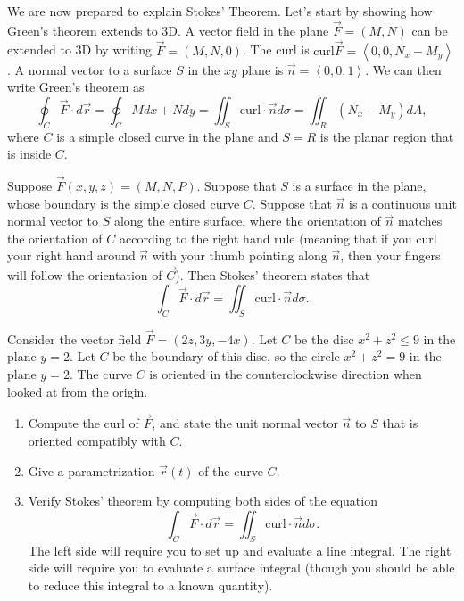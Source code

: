We are now prepared to explain Stokes' Theorem.  Let's start by showing how Green's theorem extends to 3D.
A vector field in the plane $\vec F = \left(M,N\right)$ can be extended to 3D by writing $\vec F = \left(M,N,0\right)$.  The curl is $\text{curl}\vec F = \left<0,0,N_x-M_y\right>$.  A normal vector to a surface $S$ in the $xy$ plane is $\vec n = \left<0,0,1\right>$. We can then write Green's theorem as $$\oint_C\vec F\cdot d\vec r = \oint_C Mdx+Ndy = \iint_S \text{curl}\cdot \vec n d\sigma = \iint_R \left(N_x-M_y\right) dA, $$ where $C$ is a simple closed curve in the plane and $S=R$ is the planar region that is inside $C$. 

\begin{theorem}
Suppose $\vec F(x,y,z) = (M,N,P)$.  Suppose that $S$ is a surface in the plane, whose boundary is the simple closed curve $C$. Suppose that $\vec n$ is a continuous unit normal vector to $S$ along the entire surface, where the orientation of $\vec n$ matches the orientation of $C$ according to the right hand rule (meaning that if you curl your right hand around $\vec n$ with your thumb pointing along $\vec n$, then your fingers will follow the orientation of $\vec C$). Then Stokes' theorem states that 
$$\int_C\vec F\cdot d\vec r = \iint_S \text{curl}\cdot \vec n d\sigma .$$
\end{theorem}


\begin{problem}
 Consider the vector field $\vec F = (2z,3y,-4x)$. Let $C$ be the disc $x^2+z^2\leq 9$ in the plane $y=2$.  Let $C$ be the boundary of this disc, so the circle $x^2+z^2=9$ in the plane $y=2$.  The curve $C$ is oriented in the counterclockwise direction when looked at from the origin.
\begin{enumerate}
 \item Compute the curl of $\vec F$, and state the unit normal vector $\vec n$ to $S$ that is oriented compatibly with $C$.
 \item Give a parametrization $\vec r(t)$ of the curve $C$. 
 \item Verify Stokes' theorem by computing both sides of the equation $$\int_C\vec F\cdot d\vec r = \iint_S \text{curl}\cdot \vec n d\sigma.$$
 The left side will require you to set up and evaluate a line integral.  The right side will require you to evaluate a surface integral (though you should be able to reduce this integral to a known quantity).
\end{enumerate}
  
\end{problem}


